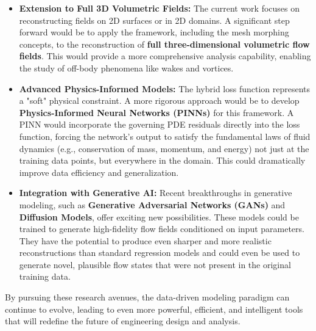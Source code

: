 \documentclass[dsc, EN]{ufabcFHZh}
\begin{document}
{\begin{itemize}
    \item \textbf{Extension to Full 3D Volumetric Fields:} The current work focuses on reconstructing fields on 2D surfaces or in 2D domains. A significant step forward would be to apply the framework, including the mesh morphing concepts, to the reconstruction of \textbf{full three-dimensional volumetric flow fields}. This would provide a more comprehensive analysis capability, enabling the study of off-body phenomena like wakes and vortices.

    \item \textbf{Advanced Physics-Informed Models:} The hybrid loss function represents a "soft" physical constraint. A more rigorous approach would be to develop \textbf{Physics-Informed Neural Networks (PINNs)} for this framework. A PINN would incorporate the governing PDE residuals directly into the loss function, forcing the network's output to satisfy the fundamental laws of fluid dynamics (e.g., conservation of mass, momentum, and energy) not just at the training data points, but everywhere in the domain. This could dramatically improve data efficiency and generalization.

    \item \textbf{Integration with Generative AI:} Recent breakthroughs in generative modeling, such as \textbf{Generative Adversarial Networks (GANs)} and \textbf{Diffusion Models}, offer exciting new possibilities. These models could be trained to generate high-fidelity flow fields conditioned on input parameters. They have the potential to produce even sharper and more realistic reconstructions than standard regression models and could even be used to generate novel, plausible flow states that were not present in the original training data.
\end{itemize}

By pursuing these research avenues, the data-driven modeling paradigm can continue to evolve, leading to even more powerful, efficient, and intelligent tools that will redefine the future of engineering design and analysis.

\backmatter

%

}
\end{document}
